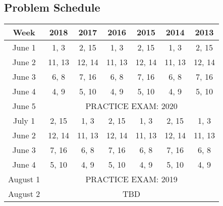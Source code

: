 \documentclass[12pt]{article}
\begin{document}
\subsection*{Problem Schedule}

\begin{center}
\begin{tabular}{c || c | c | c | c | c | c }
\toprule
Week & 2018 & 2017 & 2016 & 2015 & 2014 & 2013 \\
\midrule
June 1 & 1, 3 & 2, 15 & 1, 3 & 2, 15 & 1, 3 & 2, 15 \\
June 2 & 11, 13 & 12, 14 & 11, 13 & 12, 14 & 11, 13 & 12, 14\\
June 3 & 6, 8 & 7, 16 & 6, 8 & 7, 16 & 6, 8 & 7, 16 \\
June 4 & 4, 9 & 5, 10 & 4, 9 & 5, 10 & 4, 9 & 5, 10 \\ \hline
June 5 & \multicolumn{6}{c}{PRACTICE EXAM: 2020} \\ \hline
July 1 & 2, 15 & 1, 3 & 2, 15 & 1, 3 & 2, 15 & 1, 3 \\
June 2 & 12, 14 & 11, 13 & 12, 14 & 11, 13 & 12, 14 & 11, 13 \\
June 3 & 7, 16 & 6, 8 & 7, 16 & 6, 8 & 7, 16 & 6, 8 \\
June 4 & 5, 10 & 4, 9 & 5, 10 & 4, 9 & 5, 10 & 4, 9 \\ \hline
August 1 & \multicolumn{6}{c}{PRACTICE EXAM: 2019} \\ \hline
August 2 & \multicolumn{6}{c}{TBD} \\ \hline
\bottomrule
\end{tabular}
\end{center}
\end{document}
